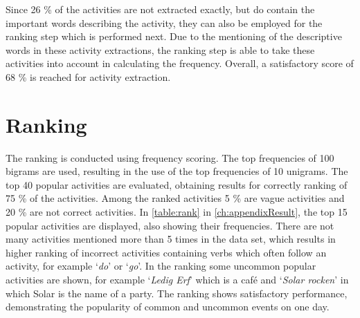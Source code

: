 Since 26 \% of the activities are not extracted exactly, but do contain the important words describing the activity, they can also be employed for the ranking step which is performed next. Due to the mentioning of the descriptive words in these activity extractions, the ranking step is able to take these activities into account in calculating the frequency. Overall, a satisfactory score of 68 \% is reached for activity extraction.


\section{Ranking}\label{sec:res_ranking}
The ranking is conducted using frequency scoring. The top frequencies of 100 bigrams are used, resulting in the use of the top frequencies of 10 unigrams. The top 40 popular activities are evaluated, obtaining results for correctly ranking of 75 \% of the activities. Among the ranked activities 5 \% are vague activities and 20 \% are not correct activities. In \autoref{table:rank} in \autoref{ch:appendixResult}, the top 15 popular activities are displayed, also showing their frequencies. There are not many activities mentioned more than 5 times in the data set, which results in higher ranking of incorrect activities containing verbs which often follow an activity, for example `\textit{do}' or `\textit{go}'. In the ranking some uncommon popular activities are shown, for example `\textit{Ledig Erf}' which is a caf\'e and `\textit{Solar rocken}' in which Solar is the name of a party. The ranking shows satisfactory performance, demonstrating the popularity of common and uncommon events on one day. 
